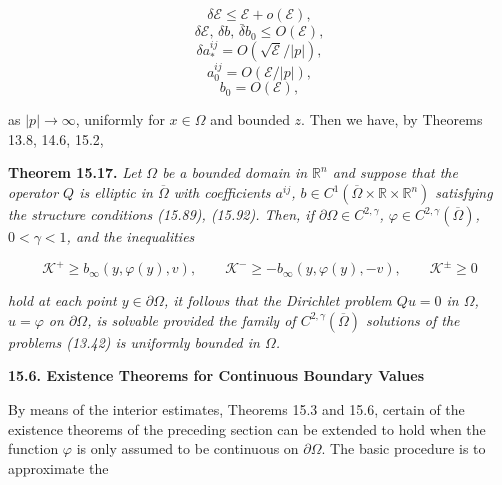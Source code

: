 \[
\delta\mathcal{E}\le \mathcal{E}+o(\mathcal{E}),
\]
\[
\delta\mathcal{E},\,\delta b,\,\bar{\delta}b_0\le O(\mathcal{E}),
\]
\[
\tag{15.92}
\delta a_*^{ij}=O\!\left(\sqrt{\mathcal{E}}/|p|\right),
\]
\[
a_0^{ij}=O(\mathcal{E}/|p|),
\]
\[
b_0=O(\mathcal{E}),
\]

\noindent as $|p|\to\infty$, uniformly for $x\in\Omega$ and bounded $z$. Then we have, by Theorems 13.8,
14.6, 15.2,

\medskip

\textbf{Theorem 15.17.} \emph{Let $\Omega$ be a bounded domain in $\mathbb{R}^n$ and suppose that the operator $Q$
is elliptic in $\overline{\Omega}$ with coefficients $a^{ij}$, $b\in C^1(\overline{\Omega}\times\mathbb{R}\times\mathbb{R}^n)$ satisfying the structure
conditions (15.89), (15.92). Then, if $\partial\Omega\in C^{2,\gamma}$, $\varphi\in C^{2,\gamma}(\overline{\Omega})$, $0<\gamma<1$, and the
inequalities}

\[
\tag{15.93}
\mathcal{K}^{+}\ge b_\infty(y,\varphi(y),v), \qquad \mathcal{K}^{-}\ge -b_\infty(y,\varphi(y),-v), \qquad \mathcal{K}^{\pm}\ge 0
\]

\emph{hold at each point $y\in\partial\Omega$, it follows that the Dirichlet problem $Qu=0$ in $\Omega$, $u=\varphi$ on
$\partial\Omega$, is solvable provided the family of $C^{2,\gamma}(\overline{\Omega})$ solutions of the problems (13.42) is
uniformly bounded in $\Omega$.}

\bigskip

\textbf{15.6. Existence Theorems for Continuous Boundary Values}

\medskip

By means of the interior estimates, Theorems 15.3 and 15.6, certain of the existence
theorems of the preceding section can be extended to hold when the function $\varphi$ is
only assumed to be continuous on $\partial\Omega$. The basic procedure is to approximate the



